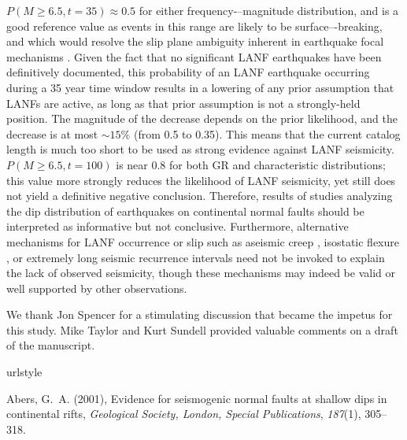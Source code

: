 \documentclass[draft,grl]{AGUTeX}
\begin{document}
\begin{article}
$P(M \ge  6.5, t = 35) \approx 0.5$ for either frequency-–magnitude
distribution, and is a good reference value as events in this range are likely
to be surface–-breaking, and which would resolve the slip plane ambiguity
inherent in earthquake focal mechanisms \citep{hecker2013eqdist}. Given the
fact that no significant LANF earthquakes have been definitively documented,
this probability of an LANF earthquake occurring during a 35 year time window
results in a lowering of any prior assumption that LANFs are active, as long as
that prior assumption is not a strongly-held position. The magnitude of the
decrease depends on the prior likelihood, and the decrease is at most $\sim 15
\%$ (from 0.5 to 0.35). This means that the current catalog length is much too
short to be used as strong evidence against LANF seismicity.  $P(M\ge6.5,
t=100)$ is near 0.8 for both GR and characteristic distributions; this value
more strongly reduces the likelihood of LANF seismicity, yet still does not
yield a definitive negative conclusion.  Therefore, results of studies
analyzing the dip distribution of earthquakes on continental normal faults
\citep{jackson1987, collettinisibson2001} should be interpreted as informative
but not conclusive. Furthermore, alternative mechanisms for LANF occurrence or
slip such as aseismic creep \citep [e.g.,][]{collettini2011lanfmech,
hreinsdottir2009altotib}, isostatic flexure \citep[e.g.,][]
{wernickeaxen1988rolling}, or extremely long seismic recurrence intervals
\citep{wernicke1995seis} need not be invoked to explain the lack of observed
seismicity, though these mechanisms may indeed be valid or well supported by
other observations.



\begin{acknowledgements}
  We thank Jon Spencer for a stimulating discussion that became the impetus for
  this study.  Mike Taylor and Kurt Sundell provided valuable comments on
  a draft of the manuscript. 
 
\end{acknowledgements}

\begin{thebibliography}{32}
\providecommand{\natexlab}[1]{#1}
\expandafter\ifx\csname urlstyle\endcsname\relax
  \providecommand{\doi}[1]{doi:\discretionary{}{}{}#1}\else
  \providecommand{\doi}{doi:\discretionary{}{}{}\begingroup
  \urlstyle{rm}\Url}\fi

Abers, G.~A. (2001), Evidence for seismogenic normal faults at shallow dips in
  continental rifts, \textit{Geological Society, London, Special Publications},
  \textit{187}(1), 305--318.


\end{thebibliography}
\end{article}
\end{document}
